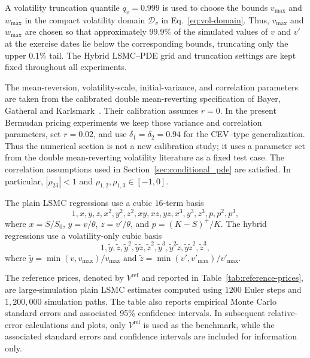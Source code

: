 \documentclass[pdflatex,sn-mathphys-num]{sn-jnl}
\theoremstyle{thmstyleone}%
\theoremstyle{thmstylethree}%
\theoremstyle{thmstyletwo}%
\begin{document}
A volatility truncation quantile $q_v=0.999$ is used to choose the bounds
$v_{\max}$ and $w_{\max}$ in the compact volatility domain
$\mathcal D_v$ in Eq.~\eqref{eq:vol-domain}. Thus, $v_{\max}$ and $w_{\max}$ are chosen so that approximately $99.9\%$ of
the simulated values of $v$ and $v'$ at the exercise dates lie below the
corresponding bounds, truncating only the upper $0.1\%$ tail. The Hybrid
LSMC--PDE grid and truncation settings are kept fixed throughout all
experiments.

The mean-reversion, volatility-scale, initial-variance, and correlation
parameters are taken from the calibrated double mean-reverting specification of
Bayer, Gatheral and Karlsmark~\citep{bayer2013fast}. Their calibration assumes
$r=0$. In the present Bermudan pricing experiments we keep those variance and
correlation parameters, set $r=0.02$, and use
$\delta_1=\delta_2=0.94$ for the CEV--type generalization. Thus the numerical
section is not a new calibration study; it uses a parameter set from the double
mean-reverting volatility literature as a fixed test case.
The correlation assumptions used in Section~\ref{sec:conditional_pde} are
satisfied. In particular, $|\rho_{23}|<1$ and $\rho_{1,2}, \rho_{1,3} \in [-1,0]$.

The plain LSMC regressions use a cubic $16$-term basis
$$
1,x,y,z,x^2,y^2,z^2,xy,xz,yz,x^3,y^3,z^3,p,p^2,p^3,
$$
where $x=S/S_0$, $y=v/\theta$, $z=v'/\theta$, and
$p=(K-S)^+/K$. The hybrid regressions use a volatility-only cubic basis
$$
1,\tilde{y},\tilde{z},\tilde{y}^2,\tilde{y}\tilde{z},\tilde{z}^2,\tilde{y}^3,\tilde{y}^2\tilde{z},\tilde{y}\tilde{z}^2,\tilde{z}^3,
$$
where
$
\tilde{y}=\min(v,v_{\max})/v_{\max} \text{ and }
\tilde{z}=\min(v',v'_{\max})/v'_{\max}.$


The reference prices, denoted by $V^{\mathrm{ref}}$ and reported in Table~\ref{tab:reference-prices}, are large-simulation plain LSMC estimates computed using $1200$ Euler steps and $1{,}200{,}000$ simulation paths. The table also reports empirical Monte Carlo standard errors and associated 95\% confidence intervals. In subsequent relative-error calculations and plots, only $V^{\mathrm{ref}}$ is used as the benchmark, while the associated standard errors and confidence intervals are included for information only.
\end{document}
